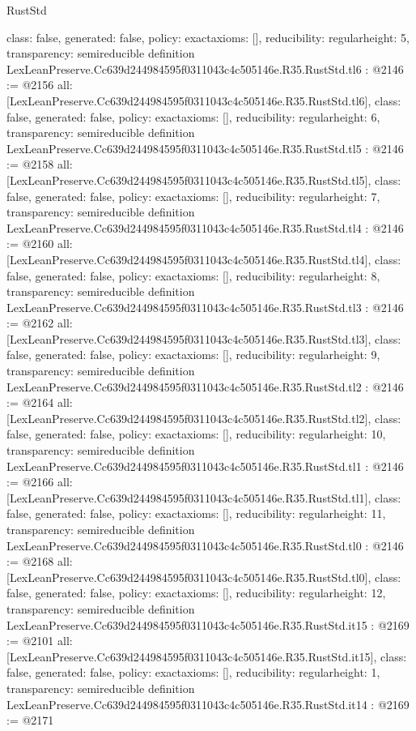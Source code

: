 \begin{lexlean}{RustStd}
\begin{coremodule}
{  class: false,
  generated: false,
  policy: exact{axioms: []},
  reducibility: regular{height: 5},
  transparency: semireducible
}
definition LexLeanPreserve.Cc639d244984595f0311043c4c505146e.R35.RustStd.tl6 : @2146 := @2156 {
  all: [LexLeanPreserve.Cc639d244984595f0311043c4c505146e.R35.RustStd.tl6],
  class: false,
  generated: false,
  policy: exact{axioms: []},
  reducibility: regular{height: 6},
  transparency: semireducible
}
definition LexLeanPreserve.Cc639d244984595f0311043c4c505146e.R35.RustStd.tl5 : @2146 := @2158 {
  all: [LexLeanPreserve.Cc639d244984595f0311043c4c505146e.R35.RustStd.tl5],
  class: false,
  generated: false,
  policy: exact{axioms: []},
  reducibility: regular{height: 7},
  transparency: semireducible
}
definition LexLeanPreserve.Cc639d244984595f0311043c4c505146e.R35.RustStd.tl4 : @2146 := @2160 {
  all: [LexLeanPreserve.Cc639d244984595f0311043c4c505146e.R35.RustStd.tl4],
  class: false,
  generated: false,
  policy: exact{axioms: []},
  reducibility: regular{height: 8},
  transparency: semireducible
}
definition LexLeanPreserve.Cc639d244984595f0311043c4c505146e.R35.RustStd.tl3 : @2146 := @2162 {
  all: [LexLeanPreserve.Cc639d244984595f0311043c4c505146e.R35.RustStd.tl3],
  class: false,
  generated: false,
  policy: exact{axioms: []},
  reducibility: regular{height: 9},
  transparency: semireducible
}
definition LexLeanPreserve.Cc639d244984595f0311043c4c505146e.R35.RustStd.tl2 : @2146 := @2164 {
  all: [LexLeanPreserve.Cc639d244984595f0311043c4c505146e.R35.RustStd.tl2],
  class: false,
  generated: false,
  policy: exact{axioms: []},
  reducibility: regular{height: 10},
  transparency: semireducible
}
definition LexLeanPreserve.Cc639d244984595f0311043c4c505146e.R35.RustStd.tl1 : @2146 := @2166 {
  all: [LexLeanPreserve.Cc639d244984595f0311043c4c505146e.R35.RustStd.tl1],
  class: false,
  generated: false,
  policy: exact{axioms: []},
  reducibility: regular{height: 11},
  transparency: semireducible
}
definition LexLeanPreserve.Cc639d244984595f0311043c4c505146e.R35.RustStd.tl0 : @2146 := @2168 {
  all: [LexLeanPreserve.Cc639d244984595f0311043c4c505146e.R35.RustStd.tl0],
  class: false,
  generated: false,
  policy: exact{axioms: []},
  reducibility: regular{height: 12},
  transparency: semireducible
}
definition LexLeanPreserve.Cc639d244984595f0311043c4c505146e.R35.RustStd.it15 : @2169 := @2101 {
  all: [LexLeanPreserve.Cc639d244984595f0311043c4c505146e.R35.RustStd.it15],
  class: false,
  generated: false,
  policy: exact{axioms: []},
  reducibility: regular{height: 1},
  transparency: semireducible
}
definition LexLeanPreserve.Cc639d244984595f0311043c4c505146e.R35.RustStd.it14 : @2169 := @2171 {
}
\end{coremodule}
\end{lexlean}
